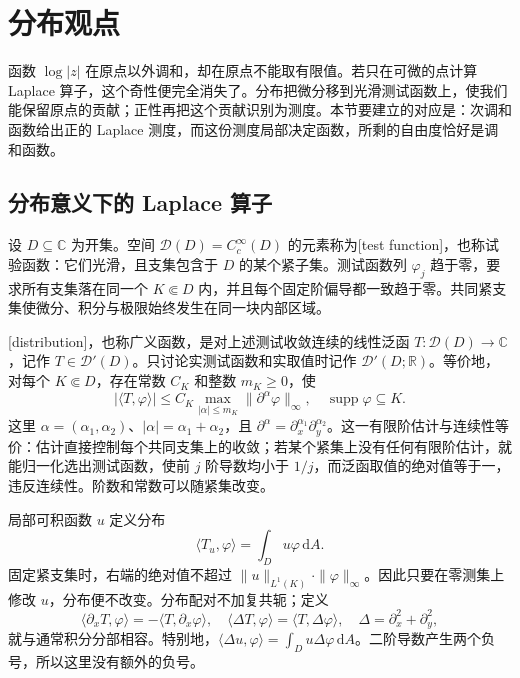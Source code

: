 \section{分布观点}
\label{b3:sec:1504}

函数 \(\log|z|\) 在原点以外调和，却在原点不能取有限值。若只在可微的点计算 Laplace 算子，这个奇性便完全消失了。分布把微分移到光滑测试函数上，使我们能保留原点的贡献；正性再把这个贡献识别为测度。本节要建立的对应是：次调和函数给出正的 Laplace 测度，而这份测度局部决定函数，所剩的自由度恰好是调和函数。

\subsection{分布意义下的 Laplace 算子}
\label{b3:subsec:150401}

设 \(D\subseteq\mathbb C\) 为开集。空间 \(\mathcal D(D)=C_c^\infty(D)\) 的元素称为[test function]，也称试验函数：它们光滑，且支集包含于 \(D\) 的某个紧子集。测试函数列 \(\varphi_j\) 趋于零，要求所有支集落在同一个 \(K\Subset D\) 内，并且每个固定阶偏导都一致趋于零。共同紧支集使微分、积分与极限始终发生在同一块内部区域。

\ProseParagraphBreak

[distribution]，也称广义函数，是对上述测试收敛连续的线性泛函 \(T:\mathcal D(D)\rightarrow\mathbb C\)，记作 \(T\in\mathcal D'(D)\)。只讨论实测试函数和实取值时记作 \(\mathcal D'(D;\mathbb R)\)。等价地，对每个 \(K\Subset D\)，存在常数 \(C_K\) 和整数 \(m_K\ge0\)，使
\[
 |\langle T,\varphi\rangle|
 \le C_K\max_{|\alpha|\le m_K}\|\partial^\alpha\varphi\|_\infty,
 \quad \operatorname{supp}\varphi\subseteq K.
\]
这里 \(\alpha=(\alpha_1,\alpha_2)\)、\(|\alpha|=\alpha_1+\alpha_2\)，且 \(\partial^\alpha=\partial_x^{\alpha_1}\partial_y^{\alpha_2}\)。这一有限阶估计与连续性等价：估计直接控制每个共同支集上的收敛；若某个紧集上没有任何有限阶估计，就能归一化选出测试函数，使前 \(j\) 阶导数均小于 \(1/j\)，而泛函取值的绝对值等于一，违反连续性。阶数和常数可以随紧集改变。

局部可积函数 \(u\) 定义分布
\[
 \langle T_u,\varphi\rangle=\int_Du\varphi\,\mathrm{d}A.
\]
固定紧支集时，右端的绝对值不超过 \(\|u\|_{L^1(K)}\cdot\|\varphi\|_\infty\)。因此只要在零测集上修改 \(u\)，分布便不改变。分布配对不加复共轭；定义
\[
 \langle\partial_xT,\varphi\rangle=-\langle T,\partial_x\varphi\rangle,
 \quad
 \langle\Delta T,\varphi\rangle=\langle T,\Delta\varphi\rangle,
 \quad \Delta=\partial_x^2+\partial_y^2,
\]
就与通常积分分部相容。特别地，\(\langle\Delta u,\varphi\rangle=\int_Du\Delta\varphi\,\mathrm{d}A\)。二阶导数产生两个负号，所以这里没有额外的负号。

